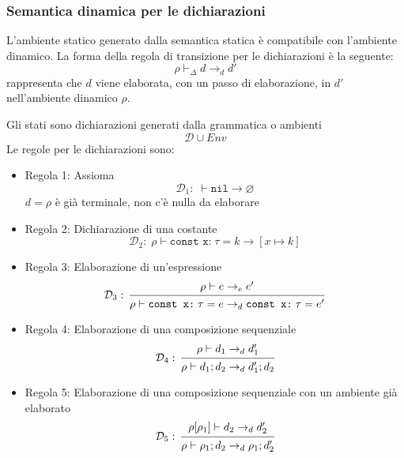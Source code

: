 \documentclass[a4paper]{article}
\begin{document}
\subsubsection{Semantica dinamica per le dichiarazioni}
L'ambiente statico generato dalla semantica statica è compatibile con l'ambiente dinamico.
La forma della regola di transizione per le dichiarazioni è la seguente:
\[
  \rho \vdash_{\Delta} d \to_d d'
\] 
rappresenta che \( d \) viene elaborata, con un passo di elaborazione, in \( d' \)
nell'ambiente dinamico \( \rho  \).

\vspace{1em}
\noindent
Gli stati sono dichiarazioni generati dalla grammatica o ambienti
\[
  \mathcal{D} \cup Env
\] 
Le regole per le dichiarazioni sono:
\begin{itemize}
  \item Regola 1: Assioma
    \[
      \mathcal{D}_1: \; \vdash \texttt{nil} \to \varnothing
    \] 
    \( d = \rho  \) è già terminale, non c'è nulla da elaborare

  \item Regola 2: Dichiarazione di una costante
    \[
      \mathcal{D}_2: \; \rho \vdash \texttt{const x:}\; \tau = k
      \to \left[ x \mapsto k \right]
    \] 

  \item Regola 3: Elaborazione di un'espressione
    \[
      \mathcal{D}_3: \;
      \begin{prooftree}
        \hypo{ \rho \vdash e \to_e e' }
        \infer1{ \rho \vdash \texttt{const x:}\; \tau = e \to_d 
        \texttt{const x:}\; \tau = e' }
      \end{prooftree}
    \] 

  \item Regola 4: Elaborazione di una composizione sequenziale
    \[
      \mathcal{D}_4: \;
      \begin{prooftree}
        \hypo{\rho \vdash d_1 \to_d d'_1}
        \infer1{\rho \vdash d_1; d_2 \to_d d'_1; d_2}
      \end{prooftree}
    \] 

  \item Regola 5: Elaborazione di una composizione sequenziale con un ambiente
    già elaborato
    \[
      \mathcal{D}_5: \;
      \begin{prooftree}
        \hypo{\rho[\rho_1] \vdash d_2 \to_d d'_2}
        \infer1{\rho \vdash \rho_1; d_2 \to_d \rho_1; d'_2}
      \end{prooftree}
    \]


\end{itemize}
\end{document}
